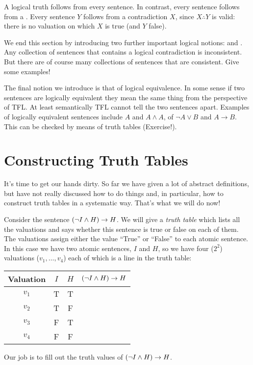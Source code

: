 A logical truth follows from every sentence. In contrast, every sentence  follows from a .
Every sentence $Y$ follows from a contradiction $X$, since $X\therefore Y$ is valid: there is no valuation on which $X$ is true (and $Y$ false).

We end this section by introducing two further important logical notions:  and .
Any collection of sentences that contains a logical contradiction is inconsistent. But there are of course many collections of sentences that are consistent. Give some examples!

The final notion we introduce is that of logical equivalence.
In some sense if two sentences are logically equivalent they mean the same thing from the perspective of TFL. At least semantically TFL cannot tell the two sentences apart. Examples of logically equivalent sentences include $A$ and $A\wedge A$, of $\neg A\vee B$ and $A\rightarrow B$. This can be checked by means of truth tables (Exercise!).



\section{Constructing Truth Tables}\label{sec:ctt}
It's time to get our hands dirty. So far we have given a lot of abstract definitions, but have not really discussed how to do things and, in particular, how to construct truth tables in a systematic way. That's what we will do now!


Consider the sentence $(\neg I\mathbin{\wedge} H)\rightarrow H$. We will give a \emph{truth table} which lists all the valuations and says whether this sentence is true or false on each of them.
The valuations assign either the value ``True'' or ``False'' to each atomic sentence. In this case we have two atomic sentences, $I$ and $H$, so we have four ($2^2$) valuations ($v_1,\dots,v_4$) each of which is a line in the truth table:
\begin{center}
\begin{tabular}{c|cc|c}
Valuation&$I$&$H$&$(\neg I\mathbin{\wedge} H)\rightarrow H$\\\hline
$v_1$&T&T&\\
$v_2$&T&F&\\
$v_3$&F&T&\\
$v_4$&F&F&
\end{tabular}
\end{center}
Our job is to fill out the truth values of $(\neg I\mathbin{\wedge} H)\rightarrow H$.

